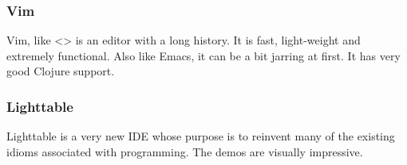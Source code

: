 \subsubsection{Vim}
\label{sec-6-1-3}

Vim, like <> is an editor with a long history. It is fast, light-weight
and extremely functional. Also like Emacs, it can be a bit jarring at
first. It has very good Clojure support.

\subsubsection{Lighttable}
\label{sec-6-1-4}

Lighttable is a very new IDE whose purpose is to reinvent many of the
existing idioms associated with programming. The demos are visually
impressive.


